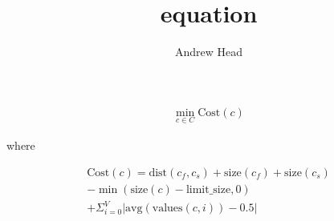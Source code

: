 \documentclass[12pt]{article}
\title{equation}
\author{Andrew Head}
\begin{document}
\maketitle

\begin{align*}
    \min_{c \in C} \text{Cost}(c)
\end{align*}

\begin{center}
where
\end{center}
\begin{align*}
    \text{Cost}(c) = \text{dist}(c_f, c_s) + \text{size}(c_f) + \text{size}(c_s) \\
    - \min(\text{size}(c) - \text{limit\_size}, 0) \\
    + \Sigma_{i=0}^V \left| \text{avg} (\text{values} (c, i)) - 0.5 \right|
\end{align*}
\end{document}
